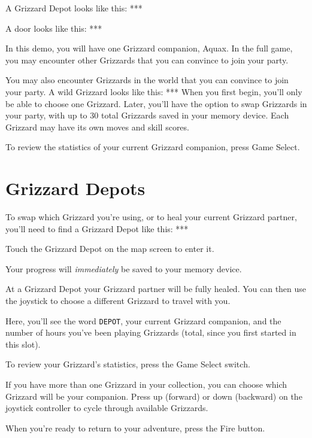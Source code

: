 \documentclass[12pt,openright,book]{memoir}
\begin{document}
A Grizzard Depot looks like this: ***

A door looks like this: ***


\ifdefined\DEMO
In this demo,  you will have one Grizzard companion,  Aquax. In the full
game, you  may encounter other Grizzards  that you can convince  to join
your party.

\else

You may also  encounter Grizzards in the world that  you can convince to
join your  party. A wild  Grizzard looks like  this: *** When  you first
begin, you'll  only be able to  choose one Grizzard. Later,  you'll have
the  option  to swap  Grizzards  in  your party,  with  up  to 30  total
Grizzards saved  in your memory device.  Each Grizzard may have  its own
moves and skill scores.

\fi

To  review the  statistics  of your  current  Grizzard companion,  press
Game Select.

\section{Grizzard Depots}

To \ifdefined\DEMO\else  swap which  Grizzard you're using,  or to  \fi heal
your current Grizzard partner, you'll need to find a Grizzard Depot like
this: ***

Touch the Grizzard Depot on the map screen to enter it.

Your progress will \emph{immediately} be saved to your memory device.

At  a  Grizzard  Depot  your  Grizzard partner  will  be  fully  healed.
\ifdefined\DEMO\else You  can then  use the joystick  to choose  a different
Grizzard to travel with you. \fi

Here,  you'll  see  the   word  \texttt{DEPOT},  your  current  Grizzard
companion,  and  the  number  of hours  you've  been  playing  Grizzards
(total, since you first started in this slot).

To review your Grizzard's statistics, press the Game Select switch.

\ifdefined\DEMO\else
If you  have more than one  Grizzard in your collection,  you can choose
which  Grizzard will  be  your  companion. Press  up  (forward) or  down
(backward)  on  the  joystick  controller  to  cycle  through  available
Grizzards.
\fi

When you're ready to return to your adventure, press the Fire button.
\end{document}
